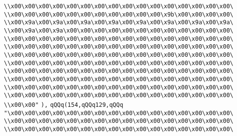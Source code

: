 \verb|\\x00\x00\x00\x00\x00\x00\x00\x00\x00\x00\x00\x00\x00\x00\x00\x00\|\newline
\verb|\\x00\x00\x00\x00\x00\x00\x00\x00\x00\x00\x00\x9b\x00\x00\x00\x00\|\newline
\verb|\\x00\x9a\x00\x9a\x00\x9a\x00\x9a\x00\x9a\x00\x9a\x00\x9a\x00\x9a\|\newline
\verb|\\x00\x9a\x00\x9a\x00\x00\x00\x00\x00\x00\x00\x00\x00\x00\x00\x00\|\newline
\verb|\\x00\x00\x00\x00\x00\x00\x00\x00\x00\x00\x00\x00\x00\x00\x00\x00\|\newline
\verb|\\x00\x00\x00\x00\x00\x00\x00\x00\x00\x00\x00\x00\x00\x00\x00\x00\|\newline
\verb|\\x00\x00\x00\x00\x00\x00\x00\x00\x00\x00\x00\x00\x00\x00\x00\x00\|\newline
\verb|\\x00\x00\x00\x00\x00\x00\x00\x00\x00\x00\x00\x00\x00\x00\x00\x00\|\newline
\verb|\\x00\x00\x00\x00\x00\x00\x00\x00\x00\x00\x00\x00\x00\x00\x00\x00\|\newline
\verb|\\x00\x00\x00\x00\x00\x00\x00\x00\x00\x00\x00\x00\x00\x00\x00\x00\|\newline
\verb|\\x00\x00\x00\x00\x00\x00\x00\x00\x00\x00\x00\x00\x00\x00\x00\x00\|\newline
\verb|\\x00\x00\x00\x00\x00\x00\x00\x00\x00\x00\x00\x00\x00\x00\x00\x00\|\newline
\verb|\\x00\x00"|\newline
\verb|),|\newline
\verb|qQQq(154,qQQq129,qQQq|\newline
\verb|"\x00\x00\x00\x00\x00\x00\x00\x00\x00\x00\x00\x00\x00\x00\x00\x00\|\newline
\verb|\\x00\x00\x00\x00\x00\x00\x00\x00\x00\x00\x00\x00\x00\x00\x00\x00\|\newline
\verb|\\x00\x00\x00\x00\x00\x00\x00\x00\x00\x00\x00\x00\x00\x00\x00\x00\|\newline
